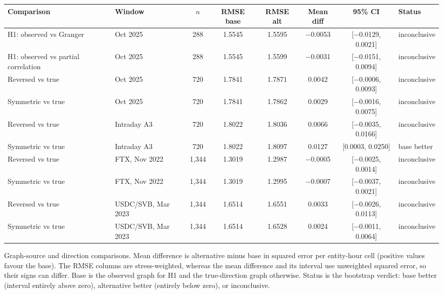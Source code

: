 \documentclass[referee,pdflatex,sn-mathphys-ay]{sn-jnl}
\newcommand{\fitbox}{\ifdim\wd\tabbox>\linewidth\resizebox{\linewidth}{!}{\usebox{\tabbox}}\else\usebox{\tabbox}\fi}%
\theoremstyle{thmstyleone}%
\theoremstyle{thmstyletwo}%
\theoremstyle{thmstylethree}%
\begin{document}
\begin{lrbox}{\tabbox}\footnotesize\setlength{\tabcolsep}{3pt}%
\begin{tabular}{@{}llcccccl@{}}
\toprule
\textbf{Comparison} & \textbf{Window} & \textbf{$n$} & \textbf{RMSE base} & \textbf{RMSE alt} & \textbf{Mean diff} & \textbf{95\% CI} & \textbf{Status}\\
\midrule
H1: observed vs Granger & Oct 2025 & 288 & 1.5545 & 1.5595 & $-$0.0053 & [$-$0.0129, 0.0021] & inconclusive \\
H1: observed vs partial correlation & Oct 2025 & 288 & 1.5545 & 1.5599 & $-$0.0031 & [$-$0.0151, 0.0094] & inconclusive \\
\midrule
Reversed vs true & Oct 2025 & 720 & 1.7841 & 1.7871 & 0.0042 & [$-$0.0006, 0.0093] & inconclusive \\
Symmetric vs true & Oct 2025 & 720 & 1.7841 & 1.7862 & 0.0029 & [$-$0.0016, 0.0075] & inconclusive \\
\midrule
Reversed vs true & Intraday A3 & 720 & 1.8022 & 1.8036 & 0.0066 & [$-$0.0035, 0.0166] & inconclusive \\
Symmetric vs true & Intraday A3 & 720 & 1.8022 & 1.8097 & 0.0127 & [0.0003, 0.0250] & base better \\
\midrule
Reversed vs true & FTX, Nov 2022 & 1{,}344 & 1.3019 & 1.2987 & $-$0.0005 & [$-$0.0025, 0.0014] & inconclusive \\
Symmetric vs true & FTX, Nov 2022 & 1{,}344 & 1.3019 & 1.2995 & $-$0.0007 & [$-$0.0037, 0.0021] & inconclusive \\
Reversed vs true & USDC/SVB, Mar 2023 & 1{,}344 & 1.6514 & 1.6551 & 0.0033 & [$-$0.0026, 0.0113] & inconclusive \\
Symmetric vs true & USDC/SVB, Mar 2023 & 1{,}344 & 1.6514 & 1.6528 & 0.0024 & [$-$0.0011, 0.0064] & inconclusive \\
\bottomrule
\end{tabular}
\end{lrbox}
\begin{tableorg}[tbp]
\centering
\caption{Graph-source and direction comparisons. Mean difference is alternative minus base in squared error per entity-hour
cell (positive values favour the base). The RMSE columns are stress-weighted, whereas the mean difference and its interval use unweighted squared error, so their signs can differ. Base is the observed graph for H1 and the true-direction graph otherwise. Status is
the bootstrap verdict: base better (interval entirely above zero), alternative better (entirely below zero), or inconclusive.}
\label{tab:diagnostics}
\fitbox
\end{tableorg}
\end{document}
